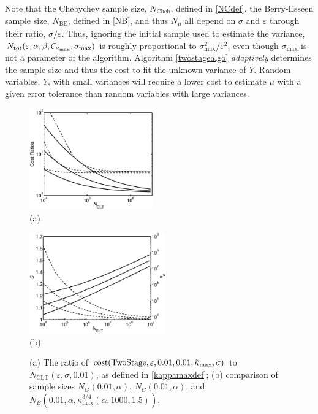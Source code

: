 \documentclass[graybox]{svmult}
\DeclareMathOperator{\cost}{cost}
\newcommand{\aMC}{{\rm TwoStage}}
\newcommand{\tkappa}{\tilde{\kappa}}
\newcommand{\cc}{\mathcal{C}}
\begin{document}
Note that the Chebychev sample size, $N_{\text{Cheb}}$, defined in \eqref{NCdef}, the Berry-Esseen sample size, $N_{\text{BE}}$, defined in \eqref{NB}, and thus $N_\mu$ all depend on $\sigma$ and $\varepsilon$ through their ratio, $\sigma/\varepsilon$.  Thus, ignoring the initial sample used to estimate the variance, $N_{\rm{tot}}(\varepsilon,\alpha, \beta, \cc_{\kappa_{\max}}, \sigma_{\max})$ is roughly proportional to $\sigma^2_{\max}/\varepsilon^{2}$, even though $\sigma_{\max}$ is not a parameter of the algorithm.  Algorithm \ref{twostagealgo} \emph{adaptively} determines the sample size and thus the cost to fit the unknown variance of $Y$. Random variables, $Y$, with small variances will require a lower cost to estimate $\mu$ with a given error tolerance than random variables with large variances. 


\begin{figure}
\centering
\begin{minipage}{2.1in}
\centering \includegraphics[width=2.1in]{MCSampleSizes} \\
(a)
\end{minipage}
\quad 
\begin{minipage}{2.3in}\centering
\includegraphics[width=2.3in]{MCnsigmafudge}\\
(b)
\end{minipage}
\caption{(a) The ratio of $\cost(\aMC,\varepsilon,0.01,0.01, \tkappa_{\max}, \sigma)$ to $N_{\mathrm{CLT}}(\varepsilon,\sigma,0.01)$, as defined in \eqref{kappamaxdef}; (b) comparison of sample sizes $ N_G(0.01,\alpha)$, $N_C(0.01,\alpha)$, and $N_B(0.01,\alpha,\kappa_{\max}^{3/4}(\alpha,1000,1.5))$.\label{Costfig}}
\end{figure}
\end{document}
